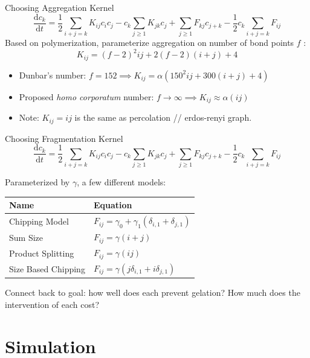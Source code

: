 \documentclass{beamer}
\begin{document}
\begin{frame}{Choosing Aggregation Kernel}
    \small
    $$
        \frac{\mathrm{d} c_{k}}{\mathrm{d} t} = \frac{1}{2} \sum_{i+j=k} K_{ij}c_{i}c_{j} - c_{k}\sum_{j \geq 1}K_{jk}c_{j} + \sum_{j\geq 1} F_{kj} c_{j+k} - \frac{1}{2} c_{k} \sum_{i+j=k}F_{ij}
    $$
    \normalsize
    Based on polymerization, parameterize aggregation on number of bond points $ f $ :
    $$
        K_{ij} = (f-2)^{2}ij +2(f-2)(i+j) + 4
    $$
    \begin{itemize}
        \item Dunbar's number: $ f=152 \implies K_{ij} = \alpha(150^2ij + 300(i+j) + 4)$
        \item Proposed \textit{homo corporatum} number: $ f \to \infty \implies K_{ij}  \approx \alpha(ij) $
        \item Note: $ K_{ij} = ij $ is the same as percolation // erdos-renyi graph.
    \end{itemize}
\end{frame}


\begin{frame}{Choosing Fragmentation Kernel }
    \small
    $$
        \frac{\mathrm{d} c_{k}}{\mathrm{d} t} = \frac{1}{2} \sum_{i+j=k} K_{ij}c_{i}c_{j} - c_{k}\sum_{j \geq 1}K_{jk}c_{j} + \sum_{j\geq 1} F_{kj} c_{j+k} - \frac{1}{2} c_{k} \sum_{i+j=k}F_{ij}
    $$
    \normalsize

    Parameterized by $\gamma$, a few different models:

    \vspace{0.5em}
    \begin{tabular}{ll}
        \toprule
        \textbf{Name}                        & \textbf{Equation}                                               \\
        \midrule
        \rowcolor{chip}  Chipping Model      & $F_{ij} = \gamma_{0} + \gamma_{1}(\delta_{i,1} + \delta_{j,1})$ \\
        \rowcolor{sum}   Sum Size            & $F_{ij} = \gamma(i + j)$                                        \\
        \rowcolor{prod}  Product Splitting   & $F_{ij} = \gamma(ij)$                                           \\
        \rowcolor{sbc}   Size Based Chipping & $F_{ij} = \gamma(j\delta_{i,1} + i\delta_{j,1})$                \\
        \bottomrule
    \end{tabular}
    \vspace{0.5em}

    Connect back to goal: how well does each prevent gelation? How much does the intervention of each cost?

\end{frame}

\section{Simulation}
\end{document}
